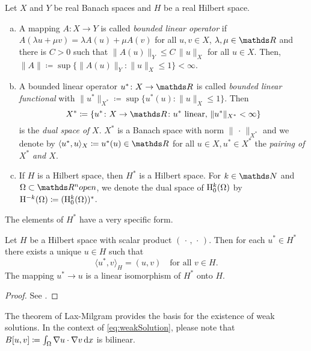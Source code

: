 \begin{defn}
  Let $X$ and $Y$ be real Banach spaces and $H$ be a real Hilbert space.
  \begin{enumerate}[a)]
    \item A mapping $A \colon X \to Y$ is called \emph{bounded linear operator} if $A(\lambda u + \mu v) = \lambda A(u) + \mu A(v)$ for all $u,v \in X$, $\lambda, \mu \in \R$ and there is $C> 0$ such that $\|A(u)\|_Y \leq C \, \|u\|_X$ for all $u \in X$.
      Then, $\|A\| \coloneqq \sup\{\|A(u)\|_Y \colon \|u\|_X \leq 1 \} < \infty$.
    \item A bounded linear operator $u^* \colon X \to \R$ is called \emph{bounded linear functional} with $\|u^*\|_{X^*} \coloneqq \sup\{u^*(u) \colon \|u\|_X \leq 1\}$.
      Then
      $$
      X^* \coloneqq \{ u^* \colon X \to \R \colon u^* \text{ linear, } \|u^*\|_{X^*} < \infty\}
      $$
      is the \emph{dual space of} $X$.
      $X^*$ is a Banach space with norm $\|\,\cdot\,\|_{X^*}$ and we denote by $\langle u^*, u\rangle_X \coloneqq u^*(u) \in \R$ for all $u \in X, u^* \in X^*$ the \emph{pairing of $X^*$ and $X$}.
    \item If $H$ is a Hilbert space, then $H^*$ is a Hilbert space.
      For $k \in \N$ and $\Omega \subset \R^n open$, we denote the dual space of $\mathrm{H}_0^k(\Omega)$ by $\mathrm{H}^{-k}(\Omega) \coloneqq (\mathrm{H}_0^k(\Omega))^*$.
  \end{enumerate}
\end{defn}

The elements of $H^*$ have a very specific form.

\begin{thm}
  \label{thm:RieszFrechet}
  Let $H$ be a Hilbert space with scalar product $(\,\cdot\, , \,\cdot\,)$.
  Then for each $u^* \in H^*$ there exists a unique $u \in H$ such that
  $$
  \langle u^*, v \rangle_H = (u, v) \quad\text{for all } v \in H.
  $$
  The mapping $u^* \to u$ is a linear isomorphism of $H^*$ onto $H$.
\end{thm}

\begin{proof}
  See \cite[Satz 2.25]{dobrowolski2010angewandte}.
\end{proof}

The theorem of Lax-Milgram provides the basis for the existence of weak solutions.
In the context of \eqref{eq:weakSolution}, please note that $B[u,v] \coloneqq \int_\Omega \nabla u \cdot \nabla v \, {\operatorname{d}\!{x}}$ is bilinear.

